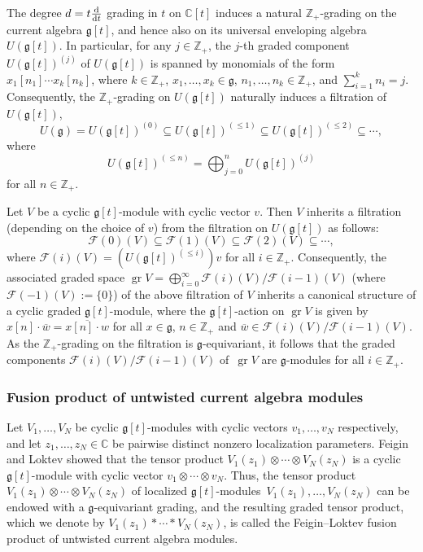 \documentclass[10pt,a4paper]{amsart}
\numberwithin{equation}{section}
\DeclareMathOperator{\gr}{gr}
\begin{document}
The degree $d=t\frac{\rm d}{{\rm d}t}$ grading in $t$ on $\mathbb{C}[t]$ induces a natural $\mathbb{Z}_+$-grading on the current algebra $\mathfrak{g}[t]$, and hence also on its universal enveloping algebra $U(\mathfrak{g}[t])$. In particular, for any $j\in\mathbb{Z}_+$, the $j$-th graded component $U(\mathfrak{g}[t])^{(j)}$ of $U(\mathfrak{g}[t])$ is spanned by monomials of the form $x_1[n_1]\cdots x_k[n_k]$, where $k\in\mathbb{Z}_+$, $x_1,\dots,x_k\in\mathfrak{g}$, $n_1,\dots,n_k\in\mathbb{Z}_+$, and $\sum_{i=1}^k n_i=j$. Consequently, the $\mathbb{Z}_+$-grading on $U(\mathfrak{g}[t])$ naturally induces a filtration of $U(\mathfrak{g}[t])$,
\begin{equation*}
U(\mathfrak{g})= U(\mathfrak{g}[t])^{(0)}\subseteq U(\mathfrak{g}[t])^{(\leq 1)}\subseteq U(\mathfrak{g}[t])^{(\leq 2)}\subseteq\cdots,
\end{equation*}
where
\[
U(\mathfrak{g}[t])^{(\leq n)}=\bigoplus_{j=0}^n U(\mathfrak{g}[t])^{(j)}
\]
 for all $n\in\mathbb{Z}_+$.

Let $V$ be a cyclic $\mathfrak{g}[t]$-module with cyclic vector $v$. Then $V$ inherits a filtration (depending on the choice of $v$) from the filtration on $U(\mathfrak{g}[t])$ as follows:
\begin{equation*}
\mathcal{F}(0)(V)\subseteq\mathcal{F}(1)(V)\subseteq\mathcal{F}(2)(V)\subseteq\cdots,
\end{equation*}
where $\mathcal{F}(i)(V)=(U(\mathfrak{g}[t])^{(\leq i)})v$ for all $i\in\mathbb{Z}_+$. Consequently, the associated graded space $\gr V=\bigoplus_{i=0}^{\infty}\mathcal{F}(i)(V)/\mathcal{F}(i-1)(V)$ (where $\mathcal{F}(-1)(V):=\{0\}$) of the above filtration of $V$ inherits a canonical structure of a cyclic graded $\mathfrak{g}[t]$-module, where the $\mathfrak{g}[t]$-action on $\gr V$ is given by~${x[n]\cdot\overline{w}=\overline{x[n]\cdot w}}$ for all $x\in\mathfrak{g}$, $n\in\mathbb{Z}_+$ and $\overline{w}\in\mathcal{F}(i)(V)/\mathcal{F}(i-1)(V)$. As the $\mathbb{Z}_+$-grading on the filtration is $\mathfrak{g}$-equivariant, it follows that the graded components $\mathcal{F}(i)(V)/\mathcal{F}(i-1)(V)$ of~$\gr V$ are $\mathfrak{g}$-modules for all $i\in\mathbb{Z}_+$.

\subsubsection{Fusion product of untwisted current algebra modules}\label{Section 2.2.3}

Let $V_1,\dots,V_N$ be cyclic $\mathfrak{g}[t]$-modules with cyclic vectors $v_1,\dots,v_N$ respectively, and let $z_1,\dots,\allowbreak z_N\in\mathbb{C}$ be pairwise distinct nonzero localization parameters. Feigin and Loktev \cite[Proposition 1.4]{FL99} showed that the tensor product $V_1(z_1)\otimes\cdots\otimes V_N(z_N)$ is a cyclic $\mathfrak{g}[t]$-module with cyclic vector $v_1\otimes\cdots\otimes v_N$. Thus, the tensor product $V_1(z_1)\otimes\cdots\otimes V_N(z_N)$ of localized $\mathfrak{g}[t]$-modules~${V_1(z_1),\dots,V_N(z_N)}$ can be endowed with a $\mathfrak{g}$-equivariant grading, and the resulting graded tensor product, which we denote by $V_1(z_1)*\cdots*V_N(z_N)$, is called the Feigin--Loktev fusion product of untwisted current algebra modules.
\end{document}
